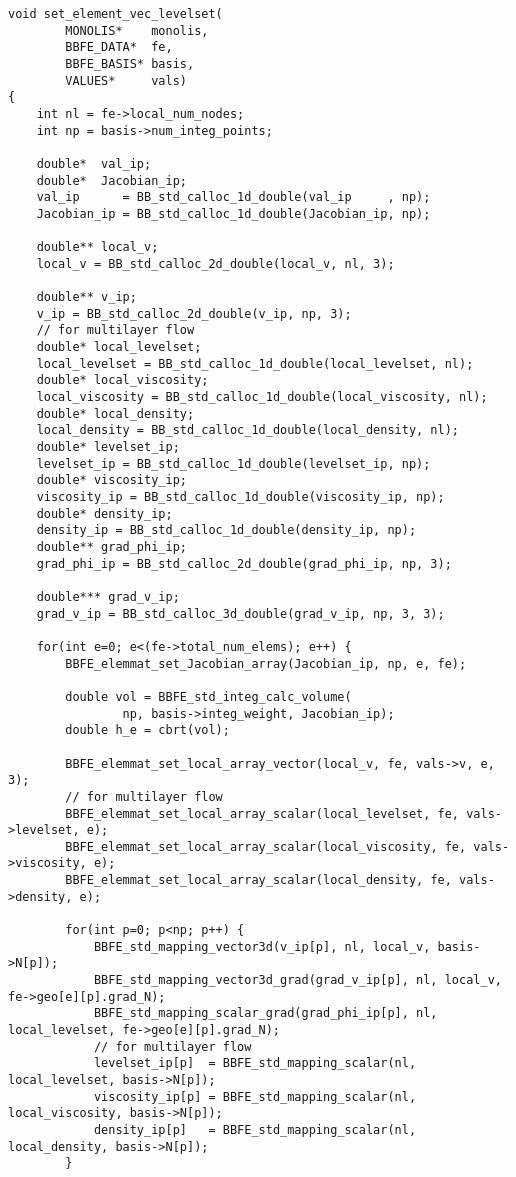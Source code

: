 \begin{lstlisting}[caption = mlflow\_fs.cの中のレベルセット関数の右辺ベクトルを計算する関数]
void set_element_vec_levelset(
		MONOLIS*	monolis,
		BBFE_DATA*	fe,
		BBFE_BASIS* basis,
		VALUES*		vals)
{
	int nl = fe->local_num_nodes;
	int np = basis->num_integ_points;

	double*  val_ip;
	double*  Jacobian_ip;
	val_ip      = BB_std_calloc_1d_double(val_ip     , np);
	Jacobian_ip = BB_std_calloc_1d_double(Jacobian_ip, np);

	double** local_v;
	local_v = BB_std_calloc_2d_double(local_v, nl, 3);

	double** v_ip; 
	v_ip = BB_std_calloc_2d_double(v_ip, np, 3);
	// for multilayer flow
	double* local_levelset;
	local_levelset = BB_std_calloc_1d_double(local_levelset, nl);
	double* local_viscosity;
	local_viscosity = BB_std_calloc_1d_double(local_viscosity, nl);
	double* local_density;
	local_density = BB_std_calloc_1d_double(local_density, nl);
	double* levelset_ip;
	levelset_ip = BB_std_calloc_1d_double(levelset_ip, np);
	double* viscosity_ip;
	viscosity_ip = BB_std_calloc_1d_double(viscosity_ip, np);
	double* density_ip;
	density_ip = BB_std_calloc_1d_double(density_ip, np);
	double** grad_phi_ip;
	grad_phi_ip = BB_std_calloc_2d_double(grad_phi_ip, np, 3);

	double*** grad_v_ip;
	grad_v_ip = BB_std_calloc_3d_double(grad_v_ip, np, 3, 3);

	for(int e=0; e<(fe->total_num_elems); e++) {
		BBFE_elemmat_set_Jacobian_array(Jacobian_ip, np, e, fe);

		double vol = BBFE_std_integ_calc_volume(
				np, basis->integ_weight, Jacobian_ip);
		double h_e = cbrt(vol);

		BBFE_elemmat_set_local_array_vector(local_v, fe, vals->v, e, 3);
		// for multilayer flow
		BBFE_elemmat_set_local_array_scalar(local_levelset, fe, vals->levelset, e);
		BBFE_elemmat_set_local_array_scalar(local_viscosity, fe, vals->viscosity, e);
		BBFE_elemmat_set_local_array_scalar(local_density, fe, vals->density, e);

		for(int p=0; p<np; p++) {
			BBFE_std_mapping_vector3d(v_ip[p], nl, local_v, basis->N[p]);
			BBFE_std_mapping_vector3d_grad(grad_v_ip[p], nl, local_v, fe->geo[e][p].grad_N);
			BBFE_std_mapping_scalar_grad(grad_phi_ip[p], nl, local_levelset, fe->geo[e][p].grad_N);
			// for multilayer flow
			levelset_ip[p]  = BBFE_std_mapping_scalar(nl, local_levelset, basis->N[p]);
			viscosity_ip[p] = BBFE_std_mapping_scalar(nl, local_viscosity, basis->N[p]);
			density_ip[p]   = BBFE_std_mapping_scalar(nl, local_density, basis->N[p]);
		}


\end{lstlisting}
